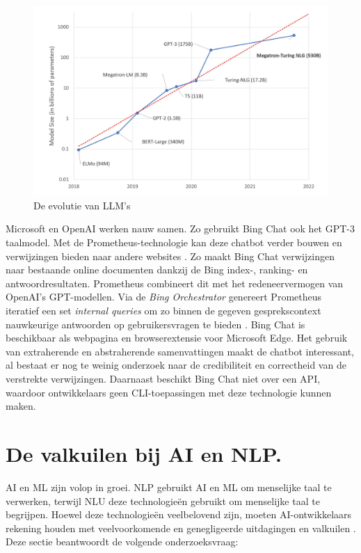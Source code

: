\begin{figure}[H]
	\begin{center}
		\includegraphics[width=\linewidth]{img/graph-language-models.png}
		\caption{De evolutie van LLM's \autocite{Simon2021}}
		\label{img:graph-language-models}
	\end{center}
\end{figure}

Microsoft en OpenAI werken nauw samen. Zo gebruikt Bing Chat ook het GPT-3 taalmodel. Met de Prometheus-technologie kan deze chatbot verder bouwen en verwijzingen bieden naar andere websites \autocite{Ribas2023}. Zo maakt Bing Chat verwijzingen naar bestaande online documenten dankzij de Bing index-, ranking- en antwoordresultaten. Prometheus combineert dit met het redeneervermogen van OpenAI’s GPT-modellen. Via de \textit{Bing Orchestrator} genereert Prometheus iteratief een set \textit{internal queries} om zo binnen de gegeven gesprekscontext nauwkeurige antwoorden op gebruikersvragen te bieden \autocite{Ribas2023}. Bing Chat is beschikbaar als webpagina en browserextensie voor Microsoft Edge. Het gebruik van extraherende en abstraherende samenvattingen maakt de chatbot interessant, al bestaat er nog te weinig onderzoek naar de credibiliteit en correctheid van de verstrekte verwijzingen. Daarnaast beschikt Bing Chat niet over een API, waardoor ontwikkelaars geen CLI-toepassingen met deze technologie kunnen maken.

\section{De valkuilen bij AI en NLP.}

AI en ML zijn volop in groei. NLP gebruikt AI en ML om menselijke taal te verwerken, terwijl NLU deze technologieën gebruikt om menselijke taal te begrijpen. Hoewel deze technologieën veelbelovend zijn, moeten AI-ontwikkelaars rekening houden met veelvoorkomende en genegligeerde uitdagingen en valkuilen \autocite{Sciforce2020, Roldos2020, Khurana2022}. Deze sectie beantwoordt de volgende onderzoeksvraag: 

